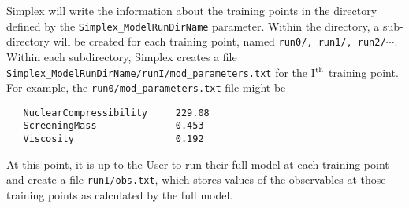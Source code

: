 \documentclass[UserManual.tex]{subfiles}
\begin{document}
Simplex will write the information about the training points in the directory defined by the {\tt Simplex\_ModelRunDirName} parameter. Within the directory, a sub-directory will be created for each training point, named {\tt run0/, run1/, run2/}$\cdots$. Within each subdirectory, Simplex creates a file {\tt Simplex\_ModelRunDirName/runI/mod\_parameters.txt} for the I$^{\rm th}$ training point. For example, the {\tt run0/mod\_parameters.txt} file might be
{\tt\begin{verbatim}
   NuclearCompressibility     229.08
   ScreeningMass              0.453
   Viscosity                  0.192
\end{verbatim}
}
At this point, it is up to the User to run their full model at each training point and create a file {\tt runI/obs.txt}, which stores values of the observables at those training points as calculated by the full model. 
\end{document}
